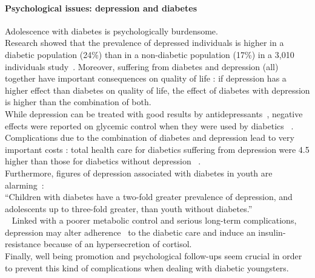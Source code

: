 \paragraph{Psychological issues: depression and diabetes}
Adolescence with diabetes is psychologically burdensome. 
\\
Research showed that the prevalence of depressed individuals is higher in a diabetic population (24\%) than in a non-diabetic population (17\%) in a 3,010 individuals study~\cite{goldney2004diabetes}. Moreover, suffering from diabetes and depression (all) together have important consequences on quality of life : if depression has a higher effect than diabetes on quality of life, the effect of diabetes with depression is higher than the combination of both. 
\\
While depression can be treated with good results by antidepressants~\cite{Goodnick2000}, negative effects were reported on glycemic control when they were used by diabetics ~\cite{Lustman2002917}. Complications due to the combination of diabetes and depression lead to very important costs : total health care for diabetics suffering from depression were 4.5 higher than those for diabetics without depression ~\cite{egede2002comorbid}.
\\
Furthermore, figures of depression associated with diabetes in youth are alarming~\cite{Grey2002907}:\\
``Children with diabetes have a two-fold greater prevalence of depression, and adolescents up to three-fold greater, than youth without diabetes.''\\
~\cite{ciechanowski2000}
Linked with a poorer metabolic control and serious long-term complications, depression may alter adherence~\cite{Lustman2002917} to the diabetic care and induce an insulin-resistance because of an hypersecretion of cortisol. %
\\
Finally, well being promotion and psychological follow-ups seem crucial in order to prevent this kind of complications when dealing with diabetic youngsters.\\


